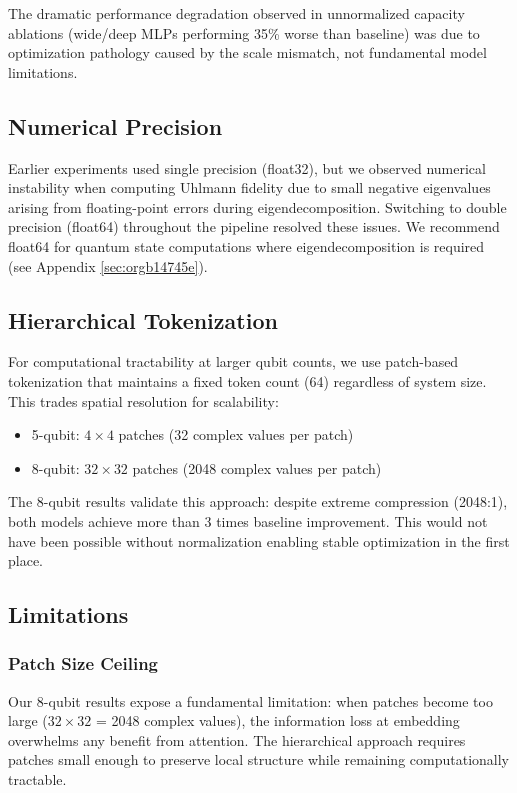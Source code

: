 \documentclass[11pt]{article}
\begin{document}
The dramatic performance degradation observed in unnormalized capacity ablations (wide/deep MLPs performing 35\% worse than baseline) was due to optimization pathology caused by the scale mismatch, not fundamental model limitations.
\subsection{Numerical Precision}
\label{sec:org70da8e5}

Earlier experiments used single precision (float32), but we observed numerical instability when computing Uhlmann fidelity due to small negative eigenvalues arising from floating-point errors during eigendecomposition. Switching to double precision (float64) throughout the pipeline resolved these issues. We recommend float64 for quantum state computations where eigendecomposition is required (see Appendix \ref{sec:orgb14745e}).
\subsection{Hierarchical Tokenization}
\label{sec:org2bcd2c3}

For computational tractability at larger qubit counts, we use patch-based tokenization that maintains a fixed token count (64) regardless of system size. This trades spatial resolution for scalability:
\begin{itemize}
\item 5-qubit: \(4\times 4\) patches (32 complex values per patch)
\item 8-qubit: \(32\times 32\) patches (2048 complex values per patch)
\end{itemize}

The 8-qubit results validate this approach: despite extreme compression (2048:1), both models achieve more than 3 times baseline improvement. This would not have been possible without normalization enabling stable optimization in the first place.
\subsection{Limitations}
\label{sec:org0da1ab1}

\subsubsection{Patch Size Ceiling}
\label{sec:org6994dc6}

Our 8-qubit results expose a fundamental limitation: when patches become too large (\(32\times 32\) = 2048 complex values), the information loss at embedding overwhelms any benefit from attention. The hierarchical approach requires patches small enough to preserve local structure while remaining computationally tractable.
\end{document}
